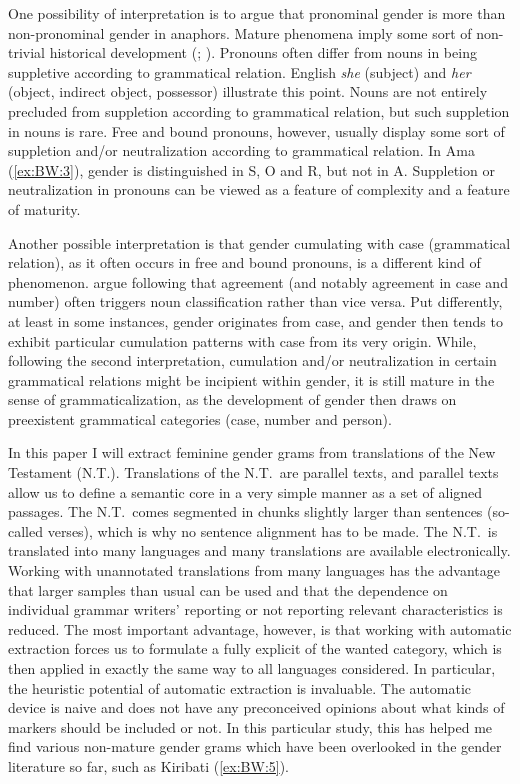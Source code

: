 \documentclass[output=collectionpaper]{langsci/langscibook}
\begin{document}
One possibility of interpretation is to argue that pronominal gender is more  than non-pronominal gender in anaphors. Mature phenomena imply some sort of non-trivial historical development (\citealt[2]{Dahl2004}; \citealt{Trudgill2011}). Pronouns often differ from nouns in being suppletive according to grammatical relation. English \textit{she} (subject) and \textit{her} (object, indirect object, possessor) illustrate this point. Nouns are not entirely precluded from suppletion according to grammatical relation, but such suppletion in nouns is rare. Free and bound pronouns, however, usually display some sort of suppletion and/or neutralization according to grammatical relation. In Ama (\ref{ex:BW:3}), gender is distinguished in S, O and R, but not in A. Suppletion or neutralization in pronouns can be viewed as a feature of complexity and a feature of maturity.

Another possible interpretation is that gender cumulating with case (grammatical relation), as it often occurs in free and bound pronouns, is a different kind of phenomenon.  argue following \cite[142]{Nichols1992} that agreement (and notably agreement in case and number) often triggers noun classification rather than vice versa. Put differently, at least in some instances, gender originates from case, and gender then tends to exhibit particular cumulation patterns with case from its very origin. While, following the second interpretation, cumulation and/or neutralization in certain grammatical relations might be incipient within gender, it is still mature in the sense of grammaticalization, as the development of gender then draws on preexistent grammatical categories (case, number and person).

In this paper I will extract feminine gender grams from translations of the New Testament (N.T.). Translations of the N.T.\ are parallel texts, and parallel texts allow us to define a semantic core in a very simple manner as a set of aligned passages. The N.T.\ comes segmented in chunks slightly larger than sentences (so-called verses), which is why no sentence alignment has to be made. The N.T.\ is translated into many languages and many translations are available electronically. Working with unannotated translations from many languages has the advantage that larger samples than usual can be used and that the dependence on individual grammar writers’ reporting or not reporting relevant characteristics is reduced. The most important advantage, however, is that working with automatic extraction forces us to formulate a fully explicit  of the wanted category, which is then applied in exactly the same way to all languages considered. In particular, the heuristic potential of automatic extraction is invaluable. The automatic device is naive and does not have any preconceived opinions about what kinds of markers should be included or not. In this particular study, this has helped me find various non-mature gender grams which have been overlooked in the gender literature so far, such as Kiribati (\ref{ex:BW:5}).
\end{document}
